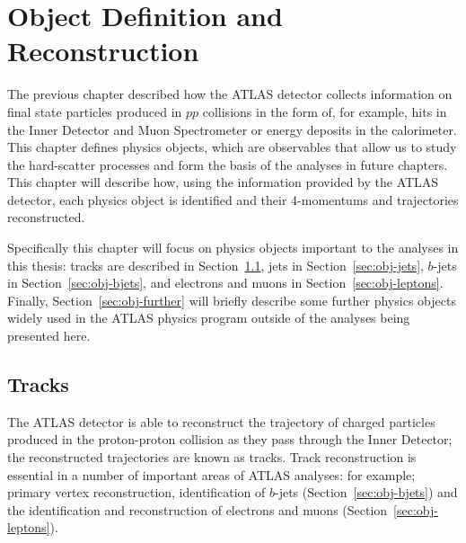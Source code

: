 \chapter{Object Definition and Reconstruction}
\label{sec:obj}

The previous chapter described how the ATLAS detector collects information on 
final state particles produced in $pp$ collisions in the form of,
for example, hits in the Inner Detector and Muon Spectrometer
or energy deposits in the calorimeter.
This chapter defines physics objects,
which are observables that allow us to study the hard-scatter processes and
form the basis of the analyses in future chapters.
This chapter will describe how, using the information provided by the ATLAS detector,
each physics object is identified
and their 4-momentums and trajectories reconstructed.

Specifically this chapter will focus on physics objects important to the analyses in this thesis:
tracks are described in Section~\ref{sec:obj-tracks}, jets in Section~\ref{sec:obj-jets},
$b$-jets in Section~\ref{sec:obj-bjets}, and electrons and muons in Section~\ref{sec:obj-leptons}.
Finally, Section~\ref{sec:obj-further} will briefly describe some further physics objects
widely used in the ATLAS physics program outside of the analyses being presented here.

\section{Tracks}
\label{sec:obj-tracks}

The ATLAS detector is able to reconstruct the trajectory of charged particles produced
in the proton-proton collision as they pass through the Inner Detector;
the reconstructed trajectories are known as tracks.
Track reconstruction is essential in a number of important areas of ATLAS analyses:
for example; primary vertex reconstruction, identification of $b$-jets (Section~\ref{sec:obj-bjets})
and the identification and reconstruction of electrons and muons (Section~\ref{sec:obj-leptons}).

